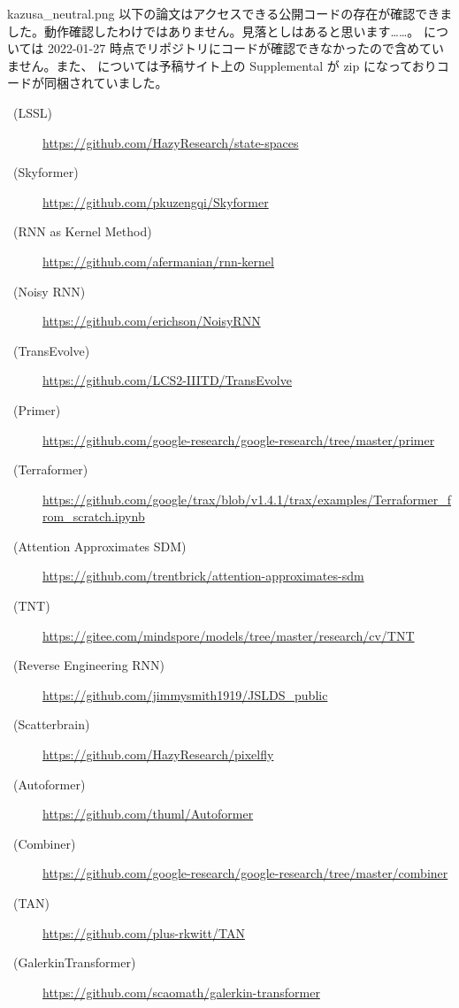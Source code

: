 \documentclass[b5paper,xelatex,ja=standard,10pt]{bxjsarticle}
\begin{document}
\begin{SERIFU}[colback=PaleIris, colbacktitle=PaleIris2]{kazusa_neutral.png}
以下の論文はアクセスできる公開コードの存在が確認できました。動作確認したわけではありません。見落としはあると思います……。\cite{AliakbarPanahi2021} \cite{FergusSimpson2021} については 2022-01-27 時点でリポジトリにコードが確認できなかったので含めていません。また、\cite{TanNguyen2021} については予稿サイト上の Supplemental が zip になっておりコードが同梱されていました。
\begin{description}
\item[\cite{AlbertGu2021} \, (LSSL)] \url{https://github.com/HazyResearch/state-spaces}
\item[\cite{YifanChen2021} \, (Skyformer)] \url{https://github.com/pkuzengqi/Skyformer}
\item[\cite{AdelineFermanian2021} \, (RNN as Kernel Method)] \url{https://github.com/afermanian/rnn-kernel}
\item[\cite{SoonHoeLim2021} \, (Noisy RNN)] \url{https://github.com/erichson/NoisyRNN}
\item[\cite{SubhabrataDutta2021} \, (TransEvolve)] \url{https://github.com/LCS2-IIITD/TransEvolve}
\item[\cite{DavidSo2021} \, (Primer)] \url{https://github.com/google-research/google-research/tree/master/primer}
\item[\cite{SebastianJaszczur2021} \, (Terraformer)] \url{https://github.com/google/trax/blob/v1.4.1/trax/examples/Terraformer_from_scratch.ipynb}
\item[\cite{TrentonBricken2021} \, (Attention Approximates SDM)] \url{https://github.com/trentbrick/attention-approximates-sdm}
\item[\cite{KaiHan2021} \, (TNT)] \url{https://gitee.com/mindspore/models/tree/master/research/cv/TNT}
\item[\cite{JimmySmith2021} \, (Reverse Engineering RNN)] \url{https://github.com/jimmysmith1919/JSLDS_public}
\item[\cite{BeidiChen2021} \, (Scatterbrain)] \url{https://github.com/HazyResearch/pixelfly}
\item[\cite{HaixuWu2021} \, (Autoformer)] \url{https://github.com/thuml/Autoformer}
\item[\cite{HongyuRen2021} \, (Combiner)] \url{https://github.com/google-research/google-research/tree/master/combiner}
\item[\cite{SebastianZeng2021} \, (TAN)] \url{https://github.com/plus-rkwitt/TAN}
\item[\cite{ShuhaoCao2021} \, (GalerkinTransformer)] \url{https://github.com/scaomath/galerkin-transformer}

\end{description}
\end{SERIFU}
\end{document}
